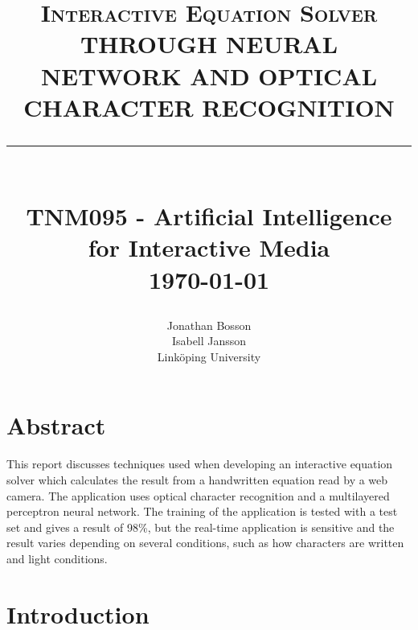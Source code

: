 \documentclass[12pt]{report}
\newcommand{\HRule}[1]{\rule{\linewidth}{#1}}
\begin{document}
\title{ \LARGE \textsc{Interactive Equation Solver}
		\\ [1.0cm]
		\normalsize \textbf{\uppercase{Through Neural Network and Optical Character Recognition}}
		\HRule{2pt} \\ [0.5cm]
		\normalsize{TNM095 - Artificial Intelligence for Interactive Media \\ [1.0cm]}
    \normalsize \today \vspace*{5\baselineskip}\thispagestyle{firststyle}}


\date{}



\author{
		Jonathan Bosson \\ 
		Isabell Jansson \\ [0.5cm]
		Link\"oping University }

\maketitle



\section*{Abstract}
This report discusses techniques used when developing an interactive equation solver which calculates the result from a handwritten equation read by a web camera. The application uses optical character recognition and a multilayered perceptron neural network. The training of the application is tested with a test set and gives a result of 98\%, but the real-time application is sensitive and the result varies depending on several conditions, such as how characters are written and light conditions.  
\newpage

\tableofcontents
\newpage

\sectionfont{\scshape}


\section*{Introduction}
\end{document}
